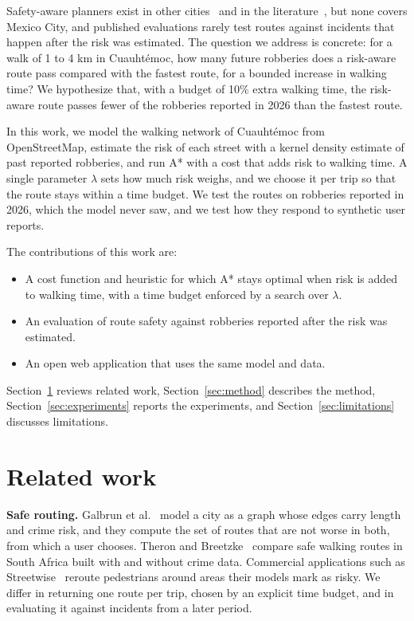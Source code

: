 \documentclass{article}
\begin{document}
Safety-aware planners exist in other cities~\cite{streetwise2026} and in the
literature~\cite{galbrun2016urban,theron2024safest}, but none covers Mexico City, and published
evaluations rarely test routes against incidents that happen after the risk was estimated. The
question we address is concrete: for a walk of 1 to 4 km in Cuauhtémoc, how many future
robberies does a risk-aware route pass compared with the fastest route, for a bounded increase
in walking time? We hypothesize that, with a budget of 10\% extra walking time, the risk-aware
route passes fewer of the robberies reported in 2026 than the fastest route.

In this work, we model the walking network of Cuauhtémoc from OpenStreetMap, estimate the risk of
each street with a kernel density estimate of past reported robberies, and run A* with a cost that
adds risk to walking time. A single parameter $\lambda$ sets how much risk weighs, and we choose it
per trip so that the route stays within a time budget. We test the routes on robberies reported
in 2026, which the model never saw, and we test how they respond to synthetic user reports.

The contributions of this work are:
\begin{itemize}
  \item A cost function and heuristic for which A* stays optimal when risk is added to walking
        time, with a time budget enforced by a search over $\lambda$.
  \item An evaluation of route safety against robberies reported after the risk was estimated.
  \item An open web application that uses the same model and data.
\end{itemize}

Section~\ref{sec:related} reviews related work, Section~\ref{sec:method} describes the method,
Section~\ref{sec:experiments} reports the experiments, and Section~\ref{sec:limitations} discusses
limitations.

\section{Related work}
\label{sec:related}

\textbf{Safe routing.} Galbrun et al.~\cite{galbrun2016urban} model a city as a graph whose edges
carry length and crime risk, and they compute the set of routes that are not worse in both, from
which a user chooses. Theron and Breetzke~\cite{theron2024safest} compare safe walking routes in
South Africa built with and without crime data. Commercial applications such as
Streetwise~\cite{streetwise2026} reroute pedestrians around areas their models mark as risky. We
differ in returning one route per trip, chosen by an explicit time budget, and in evaluating it
against incidents from a later period.
\end{document}
